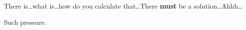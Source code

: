 \documentclass{article}
\title{\vspace{-2cm}\titlevar}
\author{\authorvar}
\date{\datevar}
\newcommand{\fade}{\dots}
\begin{document}
	\maketitle
	
	There is\fade what is\fade how do you calculate that\fade There \textbf{must} be a solution\fade Ahhh\fade
	\begin{center}
		Such pressure.
	\end{center}
\end{document}
